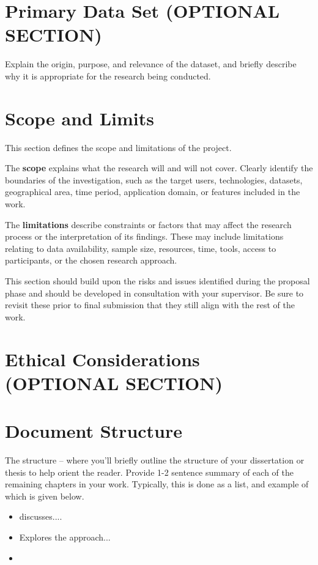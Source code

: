 \section{Primary Data Set (OPTIONAL SECTION)}\label{sec:primary-data-set}
Explain the origin, purpose, and relevance of the dataset, and briefly describe why it is appropriate for the research being conducted.


\section{Scope and Limits}\label{sec:scope-and-limits}
This section defines the scope and limitations of the project.

The \textbf{scope} explains what the research will and will not cover. Clearly identify the boundaries of the investigation, such as the target users, technologies, datasets, geographical area, time period, application domain, or features included in the work.

The \textbf{limitations} describe constraints or factors that may affect the research process or the interpretation of its findings. These may include limitations relating to data availability, sample size, resources, time, tools, access to participants, or the chosen research approach.

This section should build upon the risks and issues identified during the proposal phase and should be developed in consultation with your supervisor.  Be sure to revisit these prior to final submission that they still align with the rest of the work.

\section{Ethical Considerations (OPTIONAL SECTION)}

\section{Document Structure}\label{sec:document-structure}
The structure – where you’ll briefly outline the structure of your dissertation or thesis to help orient the reader. Provide 1-2 sentence summary of each of the remaining chapters in your work. Typically, this is done as a list, and example of which is given below.

\begin{itemize}[leftmargin=3cm]
    \item [Chapter \ref{chap:LitReview}] discusses.... 
    \item [Chapter \ref{chap:Methodology}] Explores the approach... 
    \item [Chapter X]
\end{itemize}

